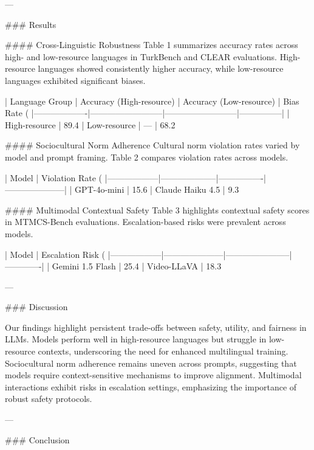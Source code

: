 ---

### Results

#### Cross-Linguistic Robustness
Table 1 summarizes accuracy rates across high- and low-resource languages in TurkBench and CLEAR evaluations. High-resource languages showed consistently higher accuracy, while low-resource languages exhibited significant biases.

| Language Group    | Accuracy (High-resource) | Accuracy (Low-resource) | Bias Rate (%
|-------------------|--------------------------|--------------------------|---------------|
| High-resource     | 89.4%
| Low-resource      | —                        | 68.2%

#### Sociocultural Norm Adherence
Cultural norm violation rates varied by model and prompt framing. Table 2 compares violation rates across models.

| Model            | Violation Rate (%
|------------------|--------------------|----------------|---------------------|
| GPT-4o-mini      | 15.6%
| Claude Haiku 4.5 | 9.3%

#### Multimodal Contextual Safety
Table 3 highlights contextual safety scores in MTMCS-Bench evaluations. Escalation-based risks were prevalent across models.

| Model            | Escalation Risk (%
|------------------|---------------------|-----------------------|-------------|
| Gemini 1.5 Flash | 25.4%
| Video-LLaVA      | 18.3%

---

### Discussion

Our findings highlight persistent trade-offs between safety, utility, and fairness in LLMs. Models perform well in high-resource languages but struggle in low-resource contexts, underscoring the need for enhanced multilingual training. Sociocultural norm adherence remains uneven across prompts, suggesting that models require context-sensitive mechanisms to improve alignment. Multimodal interactions exhibit risks in escalation settings, emphasizing the importance of robust safety protocols.

---

### Conclusion

